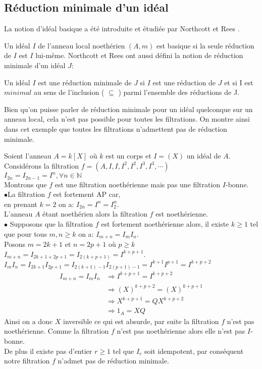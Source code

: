 \subsection{Réduction minimale d'un idéal}
La notion d'idéal basique a été introduite et étudiée par Northcott et Rees \cite{No}.
\begin{madefinition}
	Un idéal $I$ de l'anneau local noethérien $(A,m)$ est basique si la seule réduction de $I$ est $I$ lui-m\^{e}me. 
	Northcott et Rees ont aussi défini la notion de réduction minimale
	d'un idéal $J$:
	
	Un idéal $I$ est une réduction minimale de $J$ si $I$ est une réduction de $J$ et si I est $minimal$ au sens de l'inclusion ( $\subseteq$ ) parmi l'ensemble des réductions de J. 
\end{madefinition}
\begin{maremarque}
	Bien qu'on puisse parler de réduction minimale pour un idéal quelconque sur un anneau local, cela n'est pas possible pour toutes les filtrations. On montre ainsi dans cet exemple que toutes les filtrations n'admettent pas de réduction minimale.
\end{maremarque}
\begin{monexemple}
	Soient l'anneau $A = k\left[ X\right]$ où $k$ est un corps et $I = (X)$ un idéal de $A$.\\
	Considérons la filtration $f = (A, I, I, I^2, I^2, I^3, I^3, \cdots)$\\
	$I_{2n} = I_{2n-1} = I^n, \forall n \in \mathbb{N}$\\
	Montrons que $f$ est une filtration noethérienne mais pas une filtration $I$-bonne.\\
	$\bullet$La filtration $f$ est fortement AP car, \\en prenant $k = 2$ on a: $I_{2n} = I^n = I_2^n$.\\
	L’anneau $A$ étant noethérien alors la filtration $f$ est noethérienne.\\
	$\bullet$ Supposons que la filtration $f$ est fortement noethérienne alors, il existe $k \geq 1$ tel que pour tous $m, n \geq k$ on a: $I_{m+n} = I_m I_n$.\\
	Posons $m = 2k+1$ et $n = 2p+1$ où $p \geq k$\\
	$I_{m+n} = I_{2k+1+2p+1} = I_{2(k+p+1)} = I^{k+p+1}$.\\
	$I_m I_n =  I_{2k+1}  I_{2p+1} =  I_{2(k+1)-1}  I_{2(p+1)-1} = I^{k+1} I^{p+1} = I^{k+p+2}$
	\begin{align*}
		I_{m+n} = I_m I_n &\Rightarrow I^{k+p+1} = I^{k+p+2}\\
		& \Rightarrow (X)^{k+p+2} = (X)^{k+p+1}\\
		&\Rightarrow X^{k+p+1} = QX^{k+p+2}\\
		&\Rightarrow 1_A = XQ
	\end{align*}
	Ainsi on a donc $X$ inversible ce qui est absurde, par suite la filtration $f$ n'est pas noethérienne. Comme la filtration $f$ n'est pas noethérienne alors elle n'est pas $I$-bonne.\\ De plus il existe pas d'entier $r \geq 1$ tel que $I_r$ soit idempotent, par conséquent notre filtration $f$ n'admet pas de réduction minimale.
\end{monexemple}
